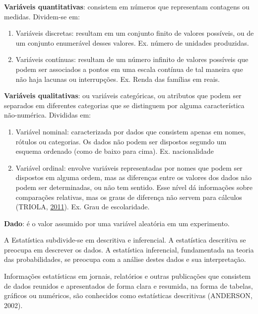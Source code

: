\documentclass[12pt,brazil,oneside]{book}
\begin{document}
\textbf{Variáveis quantitativas}: consistem em números que representam
contagens ou medidas. Dividem-se em:

\begin{enumerate}
\def\labelenumi{\alph{enumi})}
\item
  Variáveis discretas: resultam em um conjunto finito de valores
  possíveis, ou de um conjunto enumerável desses valores. Ex. número de
  unidades produzidas.
\item
  Variáveis contínuas: resultam de um número infinito de valores
  possíveis que podem ser associados a pontos em uma escala contínua de
  tal maneira que não haja lacunas ou interrupções. Ex. Renda das
  famílias em reais.
\end{enumerate}

\textbf{Variáveis qualitativas}: ou variáveis categóricas, ou atributos
que podem ser separados em diferentes categorias que se distinguem por
alguma característica não-numérica. Divididas em:

\begin{enumerate}
\def\labelenumi{\alph{enumi})}
\item
  Variável nominal: caracterizada por dados que consistem apenas em
  nomes, rótulos ou categorias. Os dados não podem ser dispostos segundo
  um esquema ordenado (como de baixo para cima). Ex. nacionalidade
\item
  Variável ordinal: envolve variáveis representadas por nomes que podem
  ser dispostos em alguma ordem, mas as diferenças entre os valores dos
  dados não podem ser determinadas, ou não tem sentido. Esse nível dá
  informações sobre comparações relativas, mas os graus de diferença não
  servem para cálculos (TRIOLA,
  \protect\hyperlink{ref-triola1999}{2011}). Ex. Grau de escolaridade.
\end{enumerate}

\textbf{Dado}: é o valor assumido por uma variável aleatória em um
experimento.

A Estatística subdivide-se em descritiva e inferencial. A estatística
descritiva se preocupa em descrever os dados. A estatística inferencial,
fundamentada na teoria das probabilidades, se preocupa com a análise
destes dados e sua interpretação.

Informações estatísticas em jornais, relatórios e outras publicações que
consistem de dados reunidos e apresentados de forma clara e resumida, na
forma de tabelas, gráficos ou numéricos, são conhecidos como
estatísticas descritivas (ANDERSON, 2002).
\end{document}
